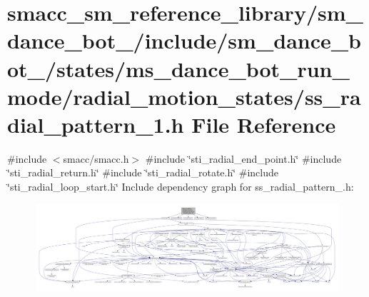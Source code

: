 \hypertarget{sm__dance__bot__2_2include_2sm__dance__bot__2_2states_2ms__dance__bot__run__mode_2radial__motion8e5350fe509a7891788750f8489f41f5}{}\section{smacc\+\_\+sm\+\_\+reference\+\_\+library/sm\+\_\+dance\+\_\+bot\+\_/include/sm\+\_\+dance\+\_\+bot\+\_/states/ms\+\_\+dance\+\_\+bot\+\_\+run\+\_\+mode/radial\+\_\+motion\+\_\+states/ss\+\_\+radial\+\_\+pattern\+\_\+1.h File Reference}
\label{sm__dance__bot__2_2include_2sm__dance__bot__2_2states_2ms__dance__bot__run__mode_2radial__motion8e5350fe509a7891788750f8489f41f5}
{\ttfamily \#include $<$smacc/smacc.\+h$>$}\newline
{\ttfamily \#include \char`\"{}sti\+\_\+radial\+\_\+end\+\_\+point.\+h\char`\"{}}\newline
{\ttfamily \#include \char`\"{}sti\+\_\+radial\+\_\+return.\+h\char`\"{}}\newline
{\ttfamily \#include \char`\"{}sti\+\_\+radial\+\_\+rotate.\+h\char`\"{}}\newline
{\ttfamily \#include \char`\"{}sti\+\_\+radial\+\_\+loop\+\_\+start.\+h\char`\"{}}\newline
Include dependency graph for ss\+\_\+radial\+\_\+pattern\+\_.\+h\+:
\nopagebreak
\begin{figure}[H]
\begin{center}
\leavevmode
\includegraphics[width=350pt]{sm__dance__bot__2_2include_2sm__dance__bot__2_2states_2ms__dance__bot__run__mode_2radial__motionb03325f40051624b46028fd4d915ce4a}
\end{center}
\end{figure}
